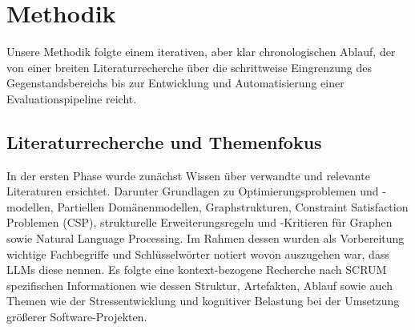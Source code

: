 \documentclass[runningheads]{llncs}
\begin{document}
\section{Methodik}
Unsere Methodik folgte einem iterativen, aber klar chronologischen Ablauf, der von einer breiten Literaturrecherche über die schrittweise Eingrenzung des Gegenstandsbereichs bis zur Entwicklung und Automatisierung einer Evaluationspipeline reicht.

\subsection{Literaturrecherche und Themenfokus}
In der ersten Phase wurde zunächst Wissen über verwandte und relevante Literaturen ersichtet. Darunter Grundlagen zu Optimierungsproblemen und -modellen, Partiellen Domänenmodellen, Graphstrukturen, Constraint Satisfaction Problemen (CSP), strukturelle Erweiterungsregeln und -Kritieren für Graphen sowie Natural Language Processing. Im Rahmen dessen wurden als Vorbereitung wichtige Fachbegriffe und Schlüsselwörter notiert wovon auszugehen war, dass LLMs diese nennen. Es folgte eine kontext-bezogene Recherche nach SCRUM spezifischen Informationen wie dessen Struktur, Artefakten, Ablauf sowie auch Themen wie der Stressentwicklung und kognitiver Belastung bei der Umsetzung größerer Software-Projekten.
\end{document}
